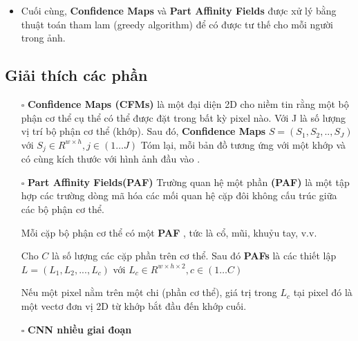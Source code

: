 \begin{itemize} %
\item Cuối cùng, \textbf{Confidence Maps} và \textbf{Part Affinity Fields} được xử lý bằng thuật toán tham lam (greedy algorithm) để có được tư thế cho mỗi người trong ảnh.
\end{itemize}

\subsection{Giải thích các phần}
\begin{itemize}
  \item[$\square$] \textbf{Confidence Maps (CFMs)} là một đại diện 2D cho niềm tin rằng một bộ phận cơ thể cụ thể có thể được đặt trong bất kỳ pixel nào. Với J là số lượng vị trí bộ phận cơ thể (khớp). Sau đó, \textbf{Confidence Maps} $S = (S_1, S_2, .., S_J)$ với $S_j \in R^{w \times h},j \in (1 \ldots J)$
  Tóm lại, mỗi bản đồ tương ứng với một khớp và có cùng kích thước với hình ảnh đầu vào .

  \item[$\square$] \textbf{Part Affinity Fields(PAF)}
  Trường quan hệ một phần \textbf{(PAF)} là một tập hợp các trường dòng mã hóa các mối quan hệ cặp đôi không cấu trúc giữa các bộ phận cơ thể.

Mỗi cặp bộ phận cơ thể có một \textbf{PAF} , tức là cổ, mũi, khuỷu tay, v.v.

Cho $C$ là số lượng các cặp phần trên cơ thể. Sau đó \textbf{PAFs} là các thiết lập \textbf{$L = (L_1, L_2, ..., L_c)$} với \textbf{$L_c \in R^{w \times h \times 2},c \in (1 \ldots C)$}

Nếu một pixel nằm trên một chi (phần cơ thể), giá trị trong $L_c$ tại pixel đó là một vectơ đơn vị 2D từ khớp bắt đầu đến khớp cuối.
\item[$\square$] \textbf{CNN nhiều giai đoạn}


\end{itemize}
